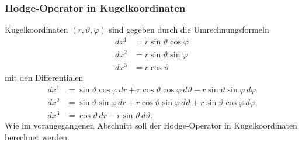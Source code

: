 \subsubsection{Hodge-Operator in Kugelkoordinaten}
Kugelkoordinaten $(r,\vartheta,\varphi)$ sind gegeben durch die
Umrechnungsformeln
\begin{equation}
\begin{aligned}
dx^1 &= r \sin\vartheta \cos\varphi \\
dx^2 &= r \sin\vartheta \sin\varphi \\
dx^3 &= r \cos\vartheta
\end{aligned}
\label{buch:hodge:skalarprodukt:eqn:kugelkoordinaten}
\end{equation}
mit den Differentialen
\begin{align*}
dx^1
&=
\sin\vartheta \cos\varphi \,dr
+
r \cos\vartheta \cos\varphi \,d\vartheta
-
r \sin\vartheta \sin\varphi \,d\varphi
\\
dx^2
&=
\sin\vartheta \sin\varphi \,dr
+
r \cos\vartheta \sin\varphi \,d\vartheta
+
r \sin\vartheta \cos\varphi \,d\varphi
\\
dx^3
&=
\cos\vartheta\,dr
-
r \sin\vartheta\,d\vartheta.
\end{align*}
Wie im vorangegangenen Abschnitt soll der Hodge-Operator in
Kugelkoordinaten berechnet werden.
